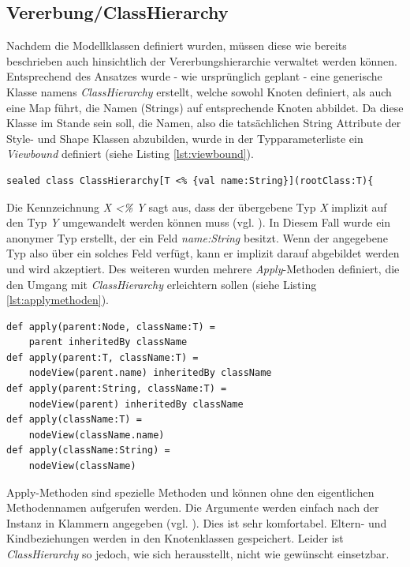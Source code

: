 \subsection{Vererbung/ClassHierarchy}
Nachdem die Modellklassen definiert wurden, müssen diese wie bereits beschrieben auch hinsichtlich der Vererbungshierarchie verwaltet werden können. Entsprechend des Ansatzes wurde - wie ursprünglich geplant - eine generische Klasse namens \textit{ClassHierarchy} erstellt, welche sowohl Knoten definiert,
als auch eine Map führt, die Namen (Strings) auf entsprechende Knoten abbildet.
Da diese Klasse im Stande sein soll, die Namen, also die tatsächlichen String  Attribute der Style- und Shape Klassen abzubilden, wurde in der Typparameterliste ein \textit{Viewbound} definiert (siehe Listing \ref{lst:viewbound}).
\begin{lstlisting}[style=scala, caption = {Viewbound. Implizite Umwandlung auf { val name:String}}, label = {lst:viewbound}]
sealed class ClassHierarchy[T <% {val name:String}](rootClass:T){
\end{lstlisting}Die Kennzeichnung \textit{ X \textless\% Y} sagt aus, dass der übergebene Typ \textit{X} implizit auf den Typ \textit{Y} umgewandelt werden können muss (vgl. ).
In Diesem Fall wurde ein anonymer Typ erstellt, der ein Feld \textit{name:String} besitzt. Wenn der angegebene Typ also über ein solches Feld verfügt, kann er implizit darauf abgebildet werden und wird akzeptiert.
Des weiteren wurden mehrere \textit{Apply}-Methoden definiert, die den Umgang mit \textit{ClassHierarchy} erleichtern sollen (siehe Listing \ref{lst:applymethoden}).
\begin{lstlisting}[style=scala, caption = {Apply Methoden, die die Benutzung von ClassHierarchy erleichtern}, label = {lst:applymethoden}]
def apply(parent:Node, className:T) =
	parent inheritedBy className
def apply(parent:T, className:T) =
	nodeView(parent.name) inheritedBy className
def apply(parent:String, className:T) =
	nodeView(parent) inheritedBy className
def apply(className:T) =
	nodeView(className.name)
def apply(className:String) = 
	nodeView(className)
\end{lstlisting}Apply-Methoden sind spezielle Methoden und können ohne den eigentlichen Methodennamen aufgerufen werden. Die Argumente werden einfach nach der Instanz in Klammern angegeben (vgl. ). Dies ist sehr komfortabel. Eltern- und Kindbeziehungen werden in den Knotenklassen gespeichert. Leider ist \textit{ClassHierarchy} so jedoch, wie sich herausstellt, nicht wie gewünscht einsetzbar.

